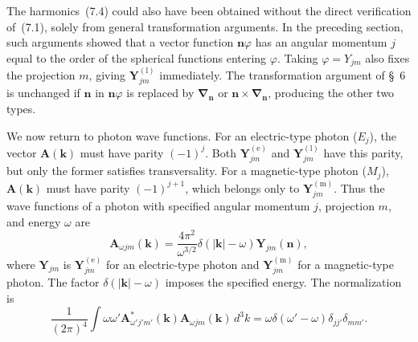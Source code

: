 The harmonics~(7.4) could also have been obtained without the direct verification of~(7.1), solely from general transformation arguments. In the preceding section, such arguments showed that a vector function $\mathbf n\varphi$ has an angular momentum $j$ equal to the order of the spherical functions entering $\varphi$. Taking $\varphi=Y_{jm}$ also fixes the projection $m$, giving $\mathbf Y^{(\text{l})}_{jm}$ immediately. The transformation argument of \S~6 is unchanged if $\mathbf n$ in $\mathbf n\varphi$ is replaced by $\boldsymbol\nabla_{\mathbf n}$ or $\mathbf n\times\boldsymbol\nabla_{\mathbf n}$, producing the other two types.

We now return to photon wave functions. For an electric-type photon ($E_j$), the vector $\mathbf A(\mathbf k)$ must have parity $(-1)^j$. Both $\mathbf Y^{(\text{e})}_{jm}$ and $\mathbf Y^{(\text{l})}_{jm}$ have this parity, but only the former satisfies transversality. For a magnetic-type photon ($M_j$), $\mathbf A(\mathbf k)$ must have
parity $(-1)^{j+1}$, which belongs only to $\mathbf Y^{(\text{m})}_{jm}$. Thus the wave functions of a photon with specified angular momentum $j$, projection $m$, and energy $\omega$ are
\begin{equation}
\mathbf A_{\omega jm}(\mathbf k)
=\frac{4\pi^2}{\omega^{3/2}}\delta(|\mathbf k|-\omega)
\mathbf Y_{jm}(\mathbf n),
\tag{7.6}
\end{equation}
where $\mathbf Y_{jm}$ is $\mathbf Y^{(\text{e})}_{jm}$ for an electric-type photon and $\mathbf Y^{(\text{m})}_{jm}$ for a magnetic-type photon. The factor $\delta(|\mathbf k|-\omega)$ imposes the specified energy. The normalization is
\begin{equation}
\frac{1}{(2\pi)^4}\int \omega\omega'
\mathbf A^*_{\omega'j'm'}(\mathbf k)
\mathbf A_{\omega jm}(\mathbf k)\,d^3k
=\omega\delta(\omega'-\omega)\delta_{jj'}\delta_{mm'}.
\tag{7.7}
\end{equation}

